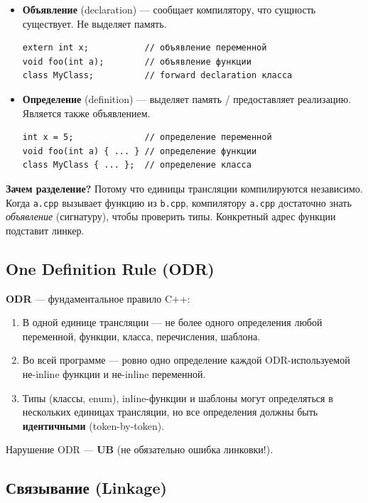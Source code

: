 \documentclass[12pt,a4paper]{article}
\begin{document}
\begin{itemize}
    \item \textbf{Объявление} (declaration) --- сообщает компилятору, что сущность существует. Не выделяет память.
\begin{lstlisting}
extern int x;           // объявление переменной
void foo(int a);        // объявление функции
class MyClass;          // forward declaration класса
\end{lstlisting}

    \item \textbf{Определение} (definition) --- выделяет память / предоставляет реализацию. Является также объявлением.
\begin{lstlisting}
int x = 5;              // определение переменной
void foo(int a) { ... } // определение функции
class MyClass { ... };  // определение класса
\end{lstlisting}
\end{itemize}

\textbf{Зачем разделение?} Потому что единицы трансляции компилируются независимо. Когда \texttt{a.cpp} вызывает функцию из \texttt{b.cpp}, компилятору \texttt{a.cpp} достаточно знать \textit{объявление} (сигнатуру), чтобы проверить типы. Конкретный адрес функции подставит линкер.

\subsection{One Definition Rule (ODR)}

\textbf{ODR} --- фундаментальное правило C++:
\begin{enumerate}
    \item В одной единице трансляции --- не более одного определения любой переменной, функции, класса, перечисления, шаблона.
    \item Во всей программе --- ровно одно определение каждой ODR-используемой не-inline функции и не-inline переменной.
    \item Типы (классы, enum), inline-функции и шаблоны могут определяться в нескольких единицах трансляции, но все определения должны быть \textbf{идентичными} (token-by-token).
\end{enumerate}

Нарушение ODR --- \textbf{UB} (не обязательно ошибка линковки!).

\subsection{Связывание (Linkage)}
\end{document}
